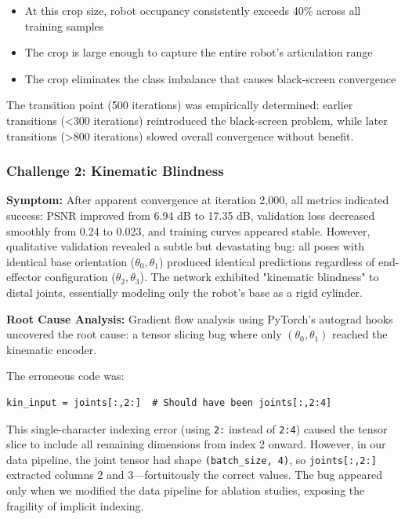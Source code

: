﻿\documentclass[12pt,a4paper,oneside]{report}
\begin{document}
\begin{itemize}
    \item At this crop size, robot occupancy consistently exceeds 40\% across all training samples
    \item The crop is large enough to capture the entire robot's articulation range
    \item The crop eliminates the class imbalance that causes black-screen convergence
\end{itemize}

The transition point (500 iterations) was empirically determined: earlier transitions (<300 iterations) reintroduced the black-screen problem, while later transitions (>800 iterations) slowed overall convergence without benefit.

\subsubsection{Challenge 2: Kinematic Blindness}

\textbf{Symptom:} After apparent convergence at iteration 2,000, all metrics indicated success: PSNR improved from 6.94 dB to 17.35 dB, validation loss decreased smoothly from 0.24 to 0.023, and training curves appeared stable. However, qualitative validation revealed a subtle but devastating bug: all poses with identical base orientation ($\theta_0, \theta_1$) produced identical predictions regardless of end-effector configuration ($\theta_2, \theta_3$). The network exhibited "kinematic blindness" to distal joints, essentially modeling only the robot's base as a rigid cylinder.

\textbf{Root Cause Analysis:} Gradient flow analysis using PyTorch's autograd hooks uncovered the root cause: a tensor slicing bug where only $(\theta_0, \theta_1)$ reached the kinematic encoder.

The erroneous code was:
\begin{verbatim}
kin_input = joints[:,2:]  # Should have been joints[:,2:4]
\end{verbatim}

This single-character indexing error (using \texttt{2:} instead of \texttt{2:4}) caused the tensor slice to include all remaining dimensions from index 2 onward. However, in our data pipeline, the joint tensor had shape \texttt{(batch\_size, 4)}, so \texttt{joints[:,2:]} extracted columns 2 and 3---fortuitously the correct values. The bug appeared only when we modified the data pipeline for ablation studies, exposing the fragility of implicit indexing.
\end{document}
